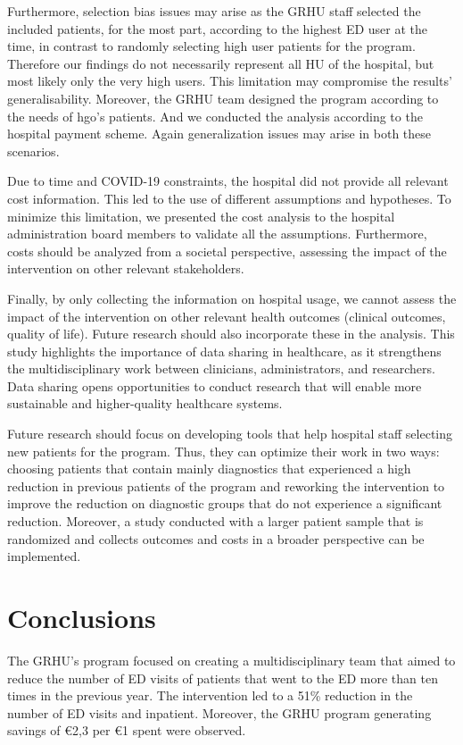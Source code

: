 \documentclass{bmcart}
\begin{document}
\par Furthermore, selection bias issues may arise as the  GRHU staff selected the included patients,  for the most part,  according to the highest ED user at the time, in contrast to randomly selecting high user patients for the program. Therefore our findings do not necessarily represent all HU of the hospital, but most likely only the very high users.
This limitation may compromise the results' generalisability.
Moreover, the GRHU team designed the program according to the needs of \gls{hgo}'s patients. And we conducted the analysis according to the hospital payment scheme. 
Again generalization issues may arise in both these scenarios. 
\par Due to time and COVID-19 constraints, the hospital did not provide all relevant cost information. 
This led to the use of different assumptions and hypotheses. 
To minimize this limitation, we presented the cost analysis to the hospital administration board members to validate all the assumptions. 
Furthermore, costs should be analyzed from a societal perspective, assessing the impact of the intervention on other relevant stakeholders. 
\par Finally, by only collecting the information on hospital usage, we cannot assess the impact of the intervention on other relevant health outcomes (\eg clinical outcomes, quality of life). Future research should also incorporate these in the analysis. 
This study highlights the importance of data sharing in healthcare, as it strengthens the multidisciplinary work between clinicians, administrators, and researchers. Data sharing opens opportunities to conduct research that will enable more sustainable and higher-quality healthcare systems. 
\par Future research should focus on developing tools that help hospital staff selecting new patients for the program. Thus, they can optimize their work in two ways: choosing patients that contain mainly diagnostics that experienced a high reduction in previous patients of the program and reworking the intervention to improve the reduction on diagnostic groups that do not experience a significant reduction. Moreover, a study conducted with a larger patient sample that is randomized and collects outcomes and costs in a broader perspective can be implemented. 
\section*{Conclusions}
The GRHU’s program focused on creating a multidisciplinary team that aimed to reduce the number of ED visits of patients that went to the ED more than ten times in the previous year. The intervention led to a 51\% reduction in the number of ED visits and inpatient. Moreover, the GRHU program generating savings of €2,3 per €1 spent were observed. 
\end{document}
